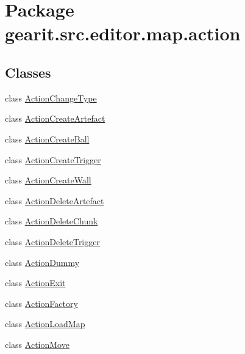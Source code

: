 \hypertarget{namespacegearit_1_1src_1_1editor_1_1map_1_1action}{\section{Package gearit.\+src.\+editor.\+map.\+action}
\label{namespacegearit_1_1src_1_1editor_1_1map_1_1action}
}
\subsection*{Classes}
\begin{DoxyCompactItemize}
\item 
class \hyperlink{classgearit_1_1src_1_1editor_1_1map_1_1action_1_1_action_change_type}{Action\+Change\+Type}
\item 
class \hyperlink{classgearit_1_1src_1_1editor_1_1map_1_1action_1_1_action_create_artefact}{Action\+Create\+Artefact}
\item 
class \hyperlink{classgearit_1_1src_1_1editor_1_1map_1_1action_1_1_action_create_ball}{Action\+Create\+Ball}
\item 
class \hyperlink{classgearit_1_1src_1_1editor_1_1map_1_1action_1_1_action_create_trigger}{Action\+Create\+Trigger}
\item 
class \hyperlink{classgearit_1_1src_1_1editor_1_1map_1_1action_1_1_action_create_wall}{Action\+Create\+Wall}
\item 
class \hyperlink{classgearit_1_1src_1_1editor_1_1map_1_1action_1_1_action_delete_artefact}{Action\+Delete\+Artefact}
\item 
class \hyperlink{classgearit_1_1src_1_1editor_1_1map_1_1action_1_1_action_delete_chunk}{Action\+Delete\+Chunk}
\item 
class \hyperlink{classgearit_1_1src_1_1editor_1_1map_1_1action_1_1_action_delete_trigger}{Action\+Delete\+Trigger}
\item 
class \hyperlink{classgearit_1_1src_1_1editor_1_1map_1_1action_1_1_action_dummy}{Action\+Dummy}
\item 
class \hyperlink{classgearit_1_1src_1_1editor_1_1map_1_1action_1_1_action_exit}{Action\+Exit}
\item 
class \hyperlink{classgearit_1_1src_1_1editor_1_1map_1_1action_1_1_action_factory}{Action\+Factory}
\item 
class \hyperlink{classgearit_1_1src_1_1editor_1_1map_1_1action_1_1_action_load_map}{Action\+Load\+Map}
\item 
class \hyperlink{classgearit_1_1src_1_1editor_1_1map_1_1action_1_1_action_move}{Action\+Move}

\end{DoxyCompactItemize}
